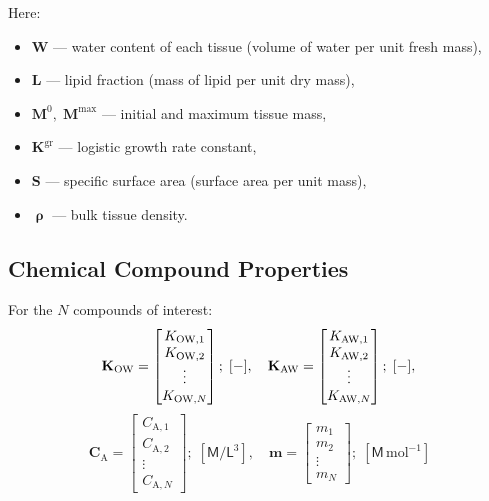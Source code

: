 \documentclass[12pt,a4paper]{article}
\newcommand{\dM}{\mathsf{M}}
\newcommand{\dL}{\mathsf{L}}
\begin{document}
\noindent Here:
\begin{itemize}[nosep]
    \item $\mathbf{W}$ --- water content of each tissue (volume of water per unit fresh mass),
    \item $\mathbf{L}$ --- lipid fraction (mass of lipid per unit dry mass),
    \item $\mathbf{M}^0,\;\mathbf{M}^\mathrm{max}$ --- initial and maximum tissue mass,
    \item $\mathbf{K}^\mathrm{gr}$ --- logistic growth rate constant,
    \item $\mathbf{S}$ --- specific surface area (surface area per unit mass),
    \item $\bm{\uprho}$ --- bulk tissue density.
\end{itemize}


\subsection{Chemical Compound Properties}

For the $N$ compounds of interest:
\begin{equation*}
    \mathbf{K}_\mathrm{OW} = 
    \begin{bmatrix}
        K_{\mathrm{OW},1} \\
        K_{\mathrm{OW},2} \\
        \vdots \\
        K_{\mathrm{OW},N}
    \end{bmatrix};\; [-], \quad
    \mathbf{K}_\mathrm{AW} = 
    \begin{bmatrix}
        K_{\mathrm{AW},1} \\
        K_{\mathrm{AW},2} \\
        \vdots \\
        K_{\mathrm{AW},N}
    \end{bmatrix};\; [-], \\
\end{equation*}
\begin{equation*}
    \mathbf{C}_\mathrm{A} =
    \begin{bmatrix}
        C_{\mathrm{A},1} \\
        C_{\mathrm{A},2} \\
        \vdots \\
        C_{\mathrm{A},N}
    \end{bmatrix};\; [\dM/\dL^3], \quad
    \mathbf{m} = 
    \begin{bmatrix}
        m_1 \\
        m_2 \\
        \vdots \\
        m_N
    \end{bmatrix};\; [\dM\,\mathrm{mol}^{-1}]
\end{equation*}
\end{document}
